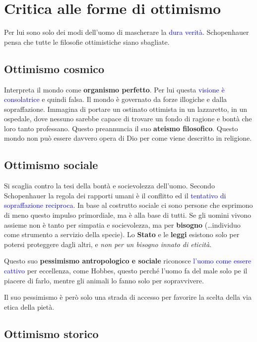 \documentclass[a4paper, twoside, titlepage]{book}
\renewcommand{\emph}[1]{\textcolor{blue}{#1}}
\begin{document}
\chapter{Critica alle forme di ottimismo}

Per lui sono solo dei modi dell’uomo di mascherare la \emph{dura verità}. Schopenhauer pensa che tutte le filosofie ottimistiche siano sbagliate.

\section{Ottimismo cosmico}

Interpreta il mondo come \textbf{organismo perfetto}. Per lui questa \emph{visione è consolatrice} e quindi falsa. Il mondo è governato da forze illogiche e dalla sopraffazione. Immagina di portare un ostinato ottimista in un lazzaretto, in un ospedale, dove nessuno sarebbe capace di trovare un fondo di ragione e bontà che loro tanto professano. Questo preannuncia il suo \textbf{ateismo filosofico}. Questo mondo non può essere davvero opera di Dio per come viene descritto in religione.

\section{Ottimismo sociale}

Si scaglia contro la tesi della bontà e socievolezza dell’uomo. Secondo Schopenhauer la regola dei rapporti umani è il conflitto ed il \emph{tentativo di sopraffazione reciproca}. In base al costrutto sociale ci sono persone che esprimono di meno questo impulso primordiale, ma è alla base di tutti. Se gli uomini vivono assieme non è tanto per simpatia e socievolezza, ma per \textbf{bisogno} (…individuo come strumento a servizio della specie). Lo \textbf{Stato} e le \textbf{leggi} esistono solo per potersi proteggere dagli altri, e \textit{non per un bisogno innato di eticità}.

Questo suo \textbf{pessimismo antropologico e sociale} riconosce \emph{l’uomo come essere cattivo} per eccellenza, come Hobbes, questo perché l’uomo fa del male solo pe il piacere di farlo, mentre gli animali lo fanno solo per sopravvivere.

Il suo pessimismo è però solo una strada di accesso per favorire la scelta della via etica della pietà.

\section{Ottimismo storico}
\end{document}
